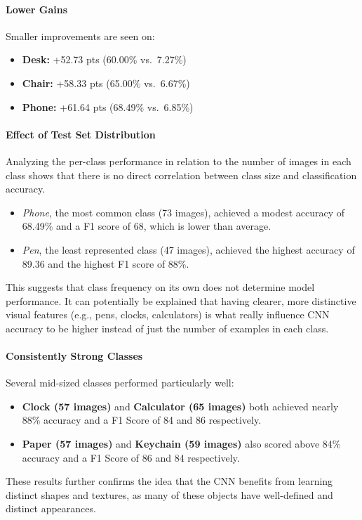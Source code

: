 \documentclass[10pt]{article}
\begin{document}
\paragraph{Lower Gains}  
Smaller improvements are seen on:
\begin{itemize}
  \item \textbf{Desk:} +52.73 pts (60.00\% vs.\ 7.27\%)
  \item \textbf{Chair:} +58.33 pts (65.00\% vs.\ 6.67\%)
  \item \textbf{Phone:} +61.64 pts (68.49\% vs.\ 6.85\%)
\end{itemize}

\paragraph{Effect of Test Set Distribution}
Analyzing the per-class performance in relation to the number of images in each class shows that there is no direct correlation between class size and classification accuracy.
\begin{itemize}
  \item \emph{Phone}, the most common class (73 images), achieved a modest accuracy of 68.49\% and a F1 score of 68, which is lower than average.
  \item \emph{Pen}, the least represented class (47 images), achieved the highest accuracy of 89.36 and the highest F1 score of 88\%.
\end{itemize}
This suggests that class frequency on its own does not determine model performance. It can potentially be explained that having clearer, more distinctive visual features (e.g., pens, clocks, calculators)
is what really influence CNN accuracy to be higher instead of just the number of examples in each class.

\paragraph{Consistently Strong Classes}
Several mid-sized classes performed particularly well:
\begin{itemize}
  \item \textbf{Clock (57 images)} and \textbf{Calculator (65 images)} both achieved nearly 88\% accuracy and a F1 Score of 84 and 86 respectively.
  \item \textbf{Paper (57 images)} and \textbf{Keychain (59 images)} also scored above 84\% accuracy and a F1 Score of 86 and 84 respectively.
\end{itemize}
These results further confirms the idea that the CNN benefits from learning distinct shapes and textures, as many of these objects have well-defined and distinct appearances.
\end{document}
